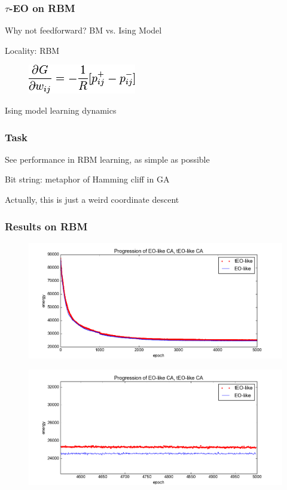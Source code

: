 \documentclass{beamer}
\begin{document}
\begin{frame}
  \frametitle{$\tau$-EO on RBM}
  Why not feedforward? BM vs. Ising Model

  Locality: RBM

  \begin{figure}
    \includegraphics{rbm_eq}
  \end{figure}

  Ising model learning dynamics

\end{frame}

\begin{frame}
  \frametitle{Task}
  See performance in RBM learning, as simple as possible

  Bit string: metaphor of Hamming cliff in GA

  Actually, this is just a weird coordinate descent
\end{frame}

\begin{frame}
  \frametitle{Results on RBM}
  \begin{figure}
    \includegraphics{eo_rbm_unzoomed}
  \end{figure}
  \begin{figure}
    \includegraphics{eo_rbm_zoomed}
  \end{figure}
\end{frame}
\end{document}
